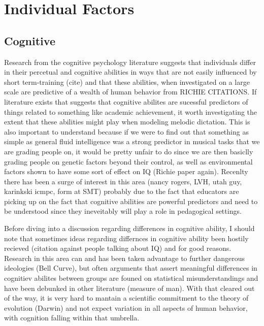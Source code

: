 \documentclass[]{book}
\theoremstyle{definition}
\theoremstyle{definition}
\theoremstyle{definition}
\theoremstyle{remark}
\begin{document}
\hypertarget{individual-factors}{%
\section{Individual Factors}\label{individual-factors}}

\hypertarget{cognitive}{%
\subsection{Cognitive}\label{cognitive}}

Research from the cognitive psychology literature suggests that
individuals differ in their percetual and cognitive abilities in ways
that are not easily influenced by short term-training (cite) and that
these abilities, when investigated on a large scale are predictive of a
wealth of human behavior from RICHIE CITATIONS. If literature exists
that suggests that cognitive abilites are sucessful predictors of things
related to something like academic achievement, it worth investigating
the extent that these abilities might play when modeling melodic
dictation. This is also important to understand because if we were to
find out that something as simple as general fluid intelligence was a
strong predictor in musical tasks that we are grading people on, it
would be pretty unfair to do since we are then basiclly grading people
on genetic factors beyond their control, as well as environmental
factors shown to have some sort of effect on IQ (Richie paper again).
Recenlty there has been a surge of interest in this area (nancy rogers,
LVH, utah guy, karinkski icmpc, form at SMT) probably due to the fact
that educators are picking up on the fact that cognitive abilities are
powerful predictors and need to be understood since they ineveitably
will play a role in pedagogical settings.

Before diving into a discussion regarding differences in cognitive
ability, I should note that sometimes ideas regarding differnces in
cognitive ability been hostily recieved (citation against people talking
about IQ) and for good reasons. Research in this area can and has been
taken advantage to further dangerous ideologies (Bell Curve), but often
arguments that assert meaningful differences in cognitiev abilites
between groups are founed on statistical misunderstandings and have been
debunked in other literature (measure of man). With that cleared out of
the way, it is very hard to mantain a scientific commitment to the
theory of evolution (Darwin) and not expect variation in all aspects of
human behavior, with cognition falling within that umbrella.
\end{document}
